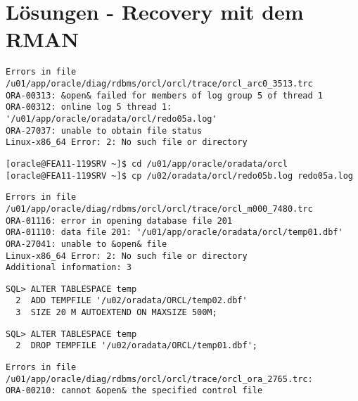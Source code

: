 \section{Lösungen - Recovery mit dem RMAN}
  \begin{enumerate}
    
      \begin{lstlisting}[caption={Ermitteln des betroffenen Redo Log Members im Alert Log},language=terminal]
Errors in file /u01/app/oracle/diag/rdbms/orcl/orcl/trace/orcl_arc0_3513.trc
ORA-00313: &open& failed for members of log group 5 of thread 1
ORA-00312: online log 5 thread 1: '/u01/app/oracle/oradata/orcl/redo05a.log'
ORA-27037: unable to obtain file status
Linux-x86_64 Error: 2: No such file or directory
      \end{lstlisting}
      \begin{lstlisting}[caption={Recovern des Members},language=terminal]
[oracle@FEA11-119SRV ~]$ cd /u01/app/oracle/oradata/orcl
[oracle@FEA11-119SRV ~]$ cp /u02/oradata/orcl/redo05b.log redo05a.log
      \end{lstlisting}
    
    
    
      \begin{lstlisting}[caption={Ermitteln des betroffenen Tempfiles im Alert Log},language=terminal]
Errors in file /u01/app/oracle/diag/rdbms/orcl/orcl/trace/orcl_m000_7480.trc
ORA-01116: error in opening database file 201
ORA-01110: data file 201: '/u01/app/oracle/oradata/orcl/temp01.dbf'
ORA-27041: unable to &open& file
Linux-x86_64 Error: 2: No such file or directory
Additional information: 3
      \end{lstlisting}
      \begin{lstlisting}[caption={Neues Tempfile erstellen},language=oracle_sql]
SQL> ALTER TABLESPACE temp
  2  ADD TEMPFILE '/u02/oradata/ORCL/temp02.dbf'
  3  SIZE 20 M AUTOEXTEND ON MAXSIZE 500M;
      \end{lstlisting}
\clearpage
      \begin{lstlisting}[caption={Beschädigtes Tempfile löschen},language=oracle_sql]
SQL> ALTER TABLESPACE temp
  2  DROP TEMPFILE '/u02/oradata/ORCL/temp01.dbf';
      \end{lstlisting}
    
      \begin{lstlisting}[caption={Ermitteln der betroffenen Kontrolldatei im Alert Log},language=terminal]
Errors in file /u01/app/oracle/diag/rdbms/orcl/orcl/trace/orcl_ora_2765.trc:
ORA-00210: cannot &open& the specified control file

\end{lstlisting}
\end{enumerate}
